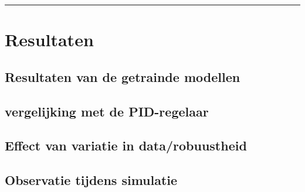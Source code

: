 \vspace{0.2cm}
{\color{gray}\hrule}
\section{Resultaten}




\subsection{Resultaten van de getrainde modellen}

\subsection{vergelijking met de PID-regelaar}

\subsection{Effect van variatie in data/robuustheid}

\subsection{Observatie tijdens simulatie}



